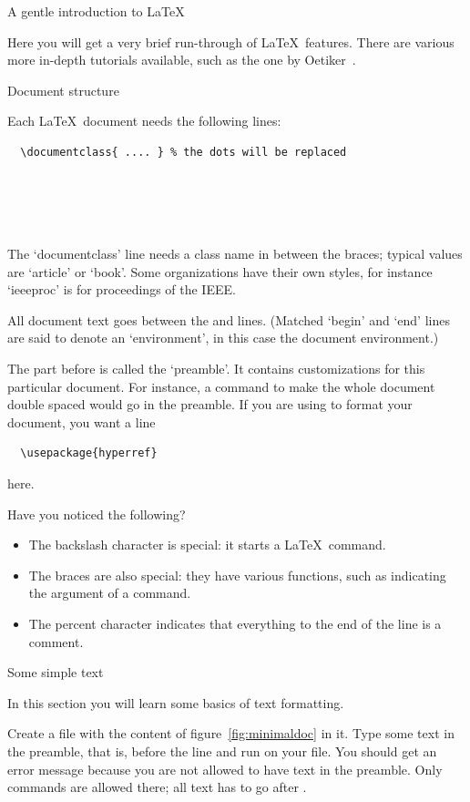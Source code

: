  {A gentle introduction to LaTeX}

Here you will get a very brief run-through of \LaTeX\ features. There
are various more in-depth tutorials available, such as the one by
Oetiker~\cite{Oetiker:LaTeXintro}.

 {Document structure}

Each \LaTeX\ document needs the following lines:
\begin{verbatim}
  \documentclass{ .... } % the dots will be replaced

  

    
\end{verbatim}
The `documentclass' line needs a class name in between the braces;
typical values are `article' or `book'. Some organizations have their
own styles, for instance `ieeeproc' is for proceedings of the IEEE.

All document text goes between the \verb++ and
\verb++ lines. (Matched `begin' and `end' lines are said
to denote an `environment', in this case the document environment.)

The part before \verb++ is called the `preamble'. It
contains customizations for this particular document. For instance, a
command to make the whole document double spaced would go in the
preamble. If you are using  to format your document, you
want a line
\begin{verbatim}
  \usepackage{hyperref}
\end{verbatim}
here.

Have you noticed the following?
\begin{itemize}
\item The backslash character is special: it starts a \LaTeX\ command.
\item The braces are also special: they have various functions, such
  as indicating the argument of a command.
\item The percent character indicates that everything to the end of
  the line is a comment.
\end{itemize}

 {Some simple text}

\begin{purpose}
  In this section you will learn some basics of text formatting.
\end{purpose}

\practical
{Create a file  with the content of
  figure~\ref{fig:minimaldoc} in it. Type some text in the preamble,
  that is, before the
   line and run  on your file.}
{You should get an error message because you are not allowed to have text
  in the preamble. Only commands are allowed there; all text has to go after
  .}{}


